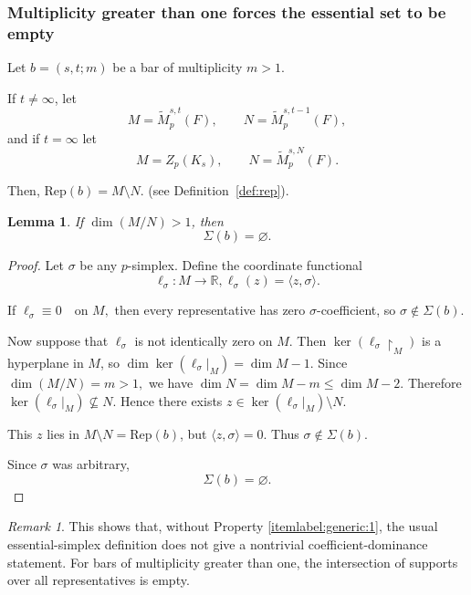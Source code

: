 \documentclass[11pt]{amsart}
\theoremstyle{theorem}
\newtheorem{lemma}{Lemma}[section]
\theoremstyle{remark}
\newtheorem{remark}{Remark}[section]
\theoremstyle{definition}
\newcommand{\hide}[1]{}
\newcommand{\Rep}{\mathrm{Rep}}
\begin{document}
\subsubsection{Multiplicity greater than one forces the essential set to be empty}

Let \(b=(s,t;m)\) be a bar of multiplicity
$m>1$.
\hide{
Let \(M\) be the corresponding representative vector space and let
\(N\subset M\) be the previous, or null, subspace. Thus
\[
\dim(M/N)=m>1.
\]
}

If $t \neq \infty$, let
\[
M=\widetilde M_p^{s,t}(F),
\qquad
N=\widetilde M_p^{s,t-1}(F),
\]
and 
if $t = \infty$ let
\[
M=Z_p(K_s),
\qquad
N=\widetilde M_p^{s,N}(F).
\]

Then,
$
\Rep(b)=M\setminus N.
$
(see Definition~\ref{def:rep}).

\begin{lemma}
If \(\dim(M/N)>1\), then
\[
\Sigma(b)=\varnothing.
\]
\end{lemma}

\begin{proof}
Let \(\sigma\) be any \(p\)-simplex. Define the coordinate functional
\[
\ell_\sigma:M\to \mathbb{R},
\ell_\sigma(z)=\langle z,\sigma\rangle.
\]

If
$
\ell_\sigma\equiv 0
\quad\text{on }M,
$
then every representative has zero \(\sigma\)-coefficient, so \(\sigma\notin
\Sigma(b)\).

Now suppose that
$\ell_\sigma$
is not identically zero on \(M\). 
Then
$
\ker(\ell_\sigma\restriction_M)
$
is a hyperplane in \(M\), so
$
\dim\ker(\ell_\sigma|_M)=\dim M-1.
$
Since
$
\dim(M/N)=m>1,
$
we have
$
\dim N=\dim M-m\leq \dim M-2
$.
Therefore
$
\ker(\ell_\sigma|_M)\not\subseteq N
$.
Hence there exists
$
z\in \ker(\ell_\sigma|_M)\setminus N
$.

This \(z\) lies in
$
M\setminus N=\Rep(b)
$,
but
$
\langle z,\sigma\rangle=0
$.
Thus
$
\sigma\notin\Sigma(b)
$.

Since \(\sigma\) was arbitrary,
\[
\Sigma(b)=\varnothing.
\]
\end{proof}

\begin{remark}
This shows that, without Property \eqref{itemlabel:generic:1}, the usual essential-simplex definition
does not give a nontrivial coefficient-dominance statement. For bars of
multiplicity greater than one, the intersection of supports over all
representatives is empty.
\end{remark}
\end{document}
